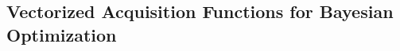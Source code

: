 \documentclass[graybox]{svmult}
\begin{document}
% 

\subsection{Vectorized Acquisition Functions for Bayesian Optimization}
\end{document}
